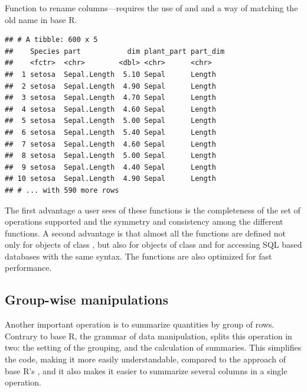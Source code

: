 \documentclass[krantz2,ChapterTOCs]{krantz}\usepackage{knitr}
\begin{document}
Function  to rename columns---requires the use of  and  and a way of matching the old name in base R.

\begin{knitrout}\footnotesize
{}\color{fgcolor}\begin{kframe}
\begin{alltt}
  
\end{alltt}
\begin{verbatim}
## # A tibble: 600 x 5
##    Species part           dim plant_part part_dim
##    <fctr>  <chr>        <dbl> <chr>      <chr>   
##  1 setosa  Sepal.Length  5.10 Sepal      Length  
##  2 setosa  Sepal.Length  4.90 Sepal      Length  
##  3 setosa  Sepal.Length  4.70 Sepal      Length  
##  4 setosa  Sepal.Length  4.60 Sepal      Length  
##  5 setosa  Sepal.Length  5.00 Sepal      Length  
##  6 setosa  Sepal.Length  5.40 Sepal      Length  
##  7 setosa  Sepal.Length  4.60 Sepal      Length  
##  8 setosa  Sepal.Length  5.00 Sepal      Length  
##  9 setosa  Sepal.Length  4.40 Sepal      Length  
## 10 setosa  Sepal.Length  4.90 Sepal      Length  
## # ... with 590 more rows
\end{verbatim}
\end{kframe}
\end{knitrout}

The first advantage a user sees of these functions is the completeness of the set of operations supported and the symmetry and consistency among the different functions. A second advantage is that almost all the functions are defined not only for objects of class , but also for objects of class  and for accessing SQL based databases with the same syntax. The functions are also optimized for fast performance.

\subsection{Group-wise manipulations}

Another important operation is to summarize quantities by group of rows. Contrary to base R, the grammar of data manipulation, splits this operation in two: the setting of the grouping, and the calculation of summaries. This simplifies the code, making it more easily understandable, compared to the approach of base R's , and it also makes it easier to summarize several columns in a single operation.
\end{document}
